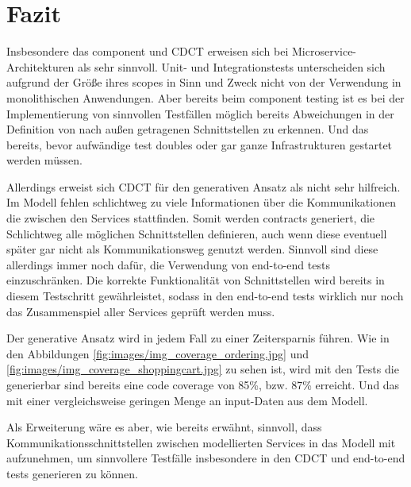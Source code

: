 \documentclass[12pt,a4paper,bibliography=totocnumbered,listof=totocnumbered]{scrartcl}
\begin{document}
\section{Fazit}\label{ch:fazit}

Insbesondere das component und \acf{CDCT} erweisen sich bei Microservice-Architekturen als sehr sinnvoll. Unit- und Integrationstests unterscheiden sich aufgrund der Größe ihres scopes in Sinn und Zweck nicht von der Verwendung in monolithischen Anwendungen. Aber bereits beim component testing ist es bei der Implementierung von sinnvollen Testfällen möglich bereits Abweichungen in der Definition von nach außen getragenen Schnittstellen zu erkennen. Und das bereits, bevor aufwändige test doubles oder gar ganze Infrastrukturen gestartet werden müssen.

Allerdings erweist sich \ac{CDCT} für den generativen Ansatz als nicht sehr hilfreich. Im Modell fehlen schlichtweg zu viele Informationen über die Kommunikationen die zwischen den Services stattfinden. Somit werden contracts generiert, die Schlichtweg alle möglichen Schnittstellen definieren, auch wenn diese eventuell später gar nicht als Kommunikationsweg genutzt werden. Sinnvoll sind diese allerdings immer noch dafür, die Verwendung von end-to-end tests einzuschränken. Die korrekte Funktionalität von Schnittstellen wird bereits in diesem Testschritt gewährleistet, sodass in den end-to-end tests wirklich nur noch das Zusammenspiel aller Services geprüft werden muss.

Der generative Ansatz wird in jedem Fall zu einer Zeitersparnis führen. Wie in den Abbildungen \ref{fig:images/img_coverage_ordering.jpg} und \ref{fig:images/img_coverage_shoppingcart.jpg} zu sehen ist, wird mit den Tests die generierbar sind bereits eine code coverage von 85\%, bzw. 87\% erreicht. Und das mit einer vergleichsweise geringen Menge an input-Daten aus dem Modell.


Als Erweiterung wäre es aber, wie bereits erwähnt, sinnvoll, dass Kommunikationsschnittstellen zwischen modellierten Services in das Modell mit aufzunehmen, um sinnvollere Testfälle insbesondere in den \ac{CDCT} und end-to-end tests generieren zu können.
\end{document}
